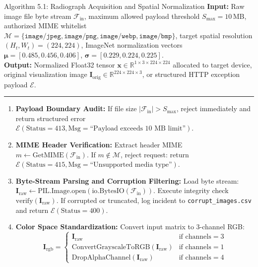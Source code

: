 \documentclass[12pt,a4paper]{report}
\begin{document}
\begin{algoBox}{Algorithm 5.1: Radiograph Acquisition and Spatial Normalization}
\label{algo:data_ingestion}
\textbf{Input:} Raw image file byte stream $\mathcal{F}_{\text{in}}$, maximum allowed payload threshold $S_{\max} = 10$\,MB, authorized MIME whitelist $\mathcal{M} = \{\texttt{image/jpeg}, \texttt{image/png}, \texttt{image/webp}, \texttt{image/bmp}\}$, target spatial resolution $(H_t, W_t) = (224, 224)$, ImageNet normalization vectors $\boldsymbol{\mu} = [0.485, 0.456, 0.406]$, $\boldsymbol{\sigma} = [0.229, 0.224, 0.225]$.\\
\textbf{Output:} Normalized Float32 tensor $\mathbf{x} \in \mathbb{R}^{1 \times 3 \times 224 \times 224}$ allocated to target device, original visualization image $\mathbf{I}_{\text{orig}} \in \mathbb{R}^{224 \times 224 \times 3}$, or structured HTTP exception payload $\mathcal{E}$.\\[-6pt]
\noindent\rule{\linewidth}{0.4pt}
\begin{enumerate}[1:]
  \item \textbf{Payload Boundary Audit:} If file size $|\mathcal{F}_{\text{in}}| > S_{\max}$, reject immediately and return structured error $\mathcal{E}(\text{Status}=413, \text{Msg}=\text{``Payload exceeds 10 MB limit''})$.
  \item \textbf{MIME Header Verification:} Extract header MIME $m \leftarrow \mathrm{GetMIME}(\mathcal{F}_{\text{in}})$. If $m \notin \mathcal{M}$, reject request: return $\mathcal{E}(\text{Status}=415, \text{Msg}=\text{``Unsupported media type''})$.
  \item \textbf{Byte-Stream Parsing and Corruption Filtering:} Load byte stream: $\mathbf{I}_{\text{raw}} \leftarrow \mathrm{PIL.Image.open}(\mathrm{io.BytesIO}(\mathcal{F}_{\text{in}}))$. Execute integrity check $\mathrm{verify}(\mathbf{I}_{\text{raw}})$. If corrupted or truncated, log incident to \texttt{corrupt\_images.csv} and return $\mathcal{E}(\text{Status}=400)$.
  \item \textbf{Color Space Standardization:} Convert input matrix to 3-channel RGB:
    \begin{equation*}
      \mathbf{I}_{\text{rgb}} = \begin{cases} 
        \mathbf{I}_{\text{raw}} & \text{if channels} = 3 \\
        \mathrm{ConvertGrayscaleToRGB}(\mathbf{I}_{\text{raw}}) & \text{if channels} = 1 \\
        \mathrm{DropAlphaChannel}(\mathbf{I}_{\text{raw}}) & \text{if channels} = 4 

\end{cases}
\end{equation*}
\end{enumerate}
\end{algoBox}
\end{document}
